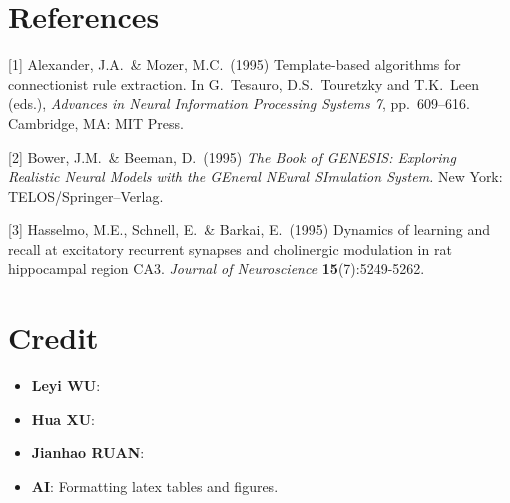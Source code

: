 \documentclass{article}
\begin{document}
\section*{References}
{
\small


[1] Alexander, J.A.\ \& Mozer, M.C.\ (1995) Template-based algorithms for
connectionist rule extraction. In G.\ Tesauro, D.S.\ Touretzky and T.K.\ Leen
(eds.), {\it Advances in Neural Information Processing Systems 7},
pp.\ 609--616. Cambridge, MA: MIT Press.


[2] Bower, J.M.\ \& Beeman, D.\ (1995) {\it The Book of GENESIS: Exploring
  Realistic Neural Models with the GEneral NEural SImulation System.}  New York:
TELOS/Springer--Verlag.


[3] Hasselmo, M.E., Schnell, E.\ \& Barkai, E.\ (1995) Dynamics of learning and
recall at excitatory recurrent synapses and cholinergic modulation in rat
hippocampal region CA3. {\it Journal of Neuroscience} {\bf 15}(7):5249-5262.
}

\section*{Credit}
\begin{itemize}
    \item \textbf{Leyi WU}: 
    \item \textbf{Hua XU}: 
    \item \textbf{Jianhao RUAN}:
    \item \textbf{AI}: Formatting latex tables and figures.

\end{itemize}
\end{document}
